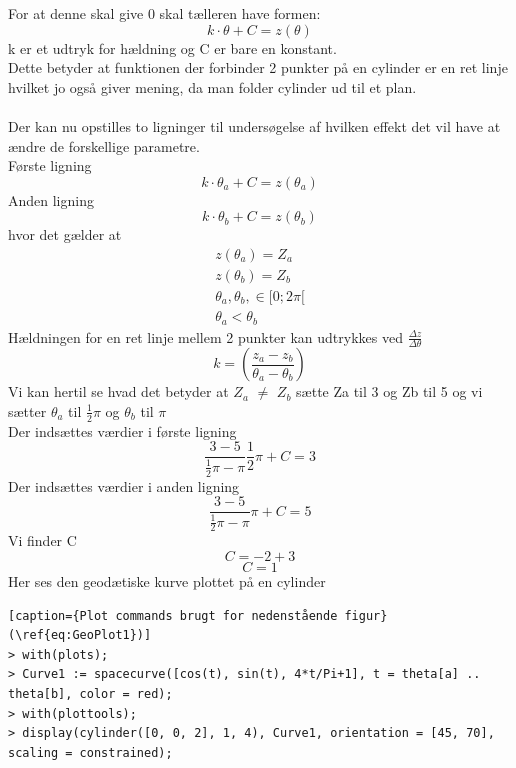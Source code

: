 For at denne skal give 0 skal tælleren have formen:
\begin{equation}
k\cdot \theta+C = z(\theta)
\end{equation}
k er et udtryk for hældning og C er bare en konstant.
\\
Dette betyder at funktionen der forbinder 2 punkter på en cylinder er en ret linje hvilket jo også giver mening, da man folder cylinder ud til et plan.
\\
\\
Der kan nu opstilles to ligninger til undersøgelse af hvilken effekt det vil have at ændre de forskellige parametre.
\\
Første ligning
\begin{equation}
k\cdot \theta_a + C = z(\theta_a)
\end{equation}
Anden ligning
\begin{equation}
k\cdot \theta_b + C = z(\theta_b)
\end{equation}
hvor det gælder at
\begin{equation}
\begin{gathered}
z(\theta_a)=Z_a \\
z(\theta_b)=Z_b\\
\theta_a,\theta_b,\in[0;2\pi[ \\
\theta_a < \theta_b
\end{gathered}
\end{equation}
Hældningen for en ret linje mellem 2 punkter kan udtrykkes ved $\frac{\Delta z}{\Delta \theta}$
\begin{equation}
k=(\frac{z_a-z_b}{\theta_a-\theta_b})
\end{equation}
Vi kan hertil se hvad det betyder at $Z_a$ $\neq$
$Z_b$ sætte Za til 3 og Zb til 5 og vi sætter $\theta_a$ til $\frac{1}{2} \pi$ og $\theta_b$ til $\pi$
\\
Der indsættes værdier i første ligning
\begin{equation}
\frac{3-5}{\frac{1}{2}\pi-\pi}\frac{1}{2} \pi + C = 3
\label{eq:ligning1}
\end{equation}
Der indsættes værdier i anden ligning
\begin{equation}
\frac{3-5}{\frac{1}{2}\pi-\pi}\pi + C = 5
\label{eq:ligning2}
\end{equation}
Vi finder C
\begin{equation}
C = -2+3
\end{equation}
\begin{equation}
C = 1
\end{equation}
Her ses den geodætiske kurve plottet på en cylinder
\begin{lstlisting}[caption={Plot commands brugt for nedenstående figur}(\ref{eq:GeoPlot1})] 
> with(plots);
> Curve1 := spacecurve([cos(t), sin(t), 4*t/Pi+1], t = theta[a] .. theta[b], color = red);
> with(plottools);
> display(cylinder([0, 0, 2], 1, 4), Curve1, orientation = [45, 70], scaling = constrained);

\end{lstlisting}

